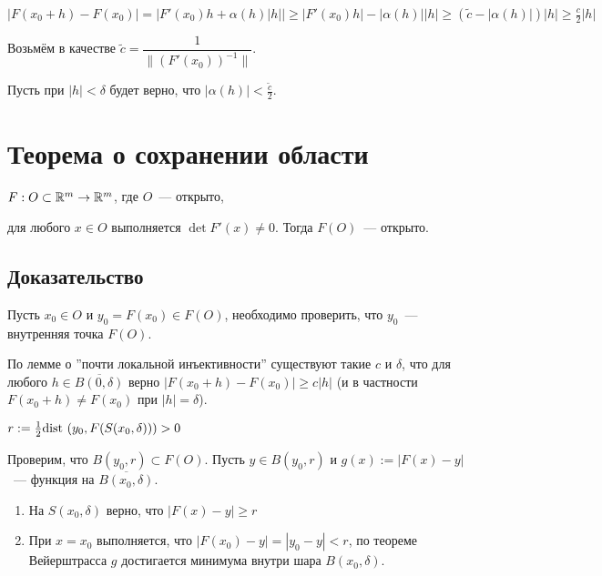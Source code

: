 \documentclass{article}
\begin{document}
            $\left| F(x_0 + h) - F(x_0) \right| = \left| F'(x_0)h + \alpha(h) \left| h \right| \right| \geq \left| F'(x_0) h \right| - \left| \alpha(h) \right| \left| h \right| \geq (\widetilde{c} - \left| \alpha(h) \right|) \left| h \right| \geq \frac{c}{2} \left| h \right|$
        
            Возьмём в качестве $\widetilde{c} = \dfrac{1}{\| (F'(x_0))^{-1} \|}$.
        
            Пусть при $|h| < \delta$ будет верно, что $\left| \alpha(h) \right| < \frac{\widetilde{c}}{2}$.
        
    \newpage
    
    \section{Теорема о сохранении области}
    
        $F : O \subset \mathbb{R}^m \rightarrow \mathbb{R}^m$, где $O$~--- открыто,
        
        для любого $x \in O$ выполняется $\det F'(x) \neq 0$. Тогда $F(O)$~--- открыто.
        
        \subsection{Доказательство}
        
            Пусть $x_0 \in O$ и $y_0 = F(x_0) \in F(O)$, необходимо проверить, что $y_0$~--- внутренняя точка $F(O)$.
            
            По лемме о ''почти локальной инъективности'' существуют такие $c$ и $\delta$, что для любого $h \in \overline{B(0, \delta)}$ верно $\left| F(x_0 + h) - F(x_0) \right| \geq c | h |$ (и в частности $F(x_0 + h) \neq F(x_0)$ при $| h | = \delta$).
            
            $r := \frac{1}{2} \dist \left( y_0, F(S(x_0, \delta)) \right) > 0$
            
            Проверим, что $B(y_0, r) \subset F(O)$. Пусть $y \in B(y_0, r)$ и $g(x) := \left| F(x) - y \right|$~--- функция на $\overline{B(x_0, \delta)}$.
            
            \begin{enumerate}
            
                \item На $S(x_0, \delta)$ верно, что $\left| F(x) - y \right| \geq r$
                
                \item При $x = x_0$ выполняется, что $\left| F(x_0) - y \right| = | y_0 - y | < r$, по теореме Вейерштрасса $g$ достигается минимума внутри шара $B(x_0, \delta)$.
                
            \end{enumerate}
            
\end{document}
